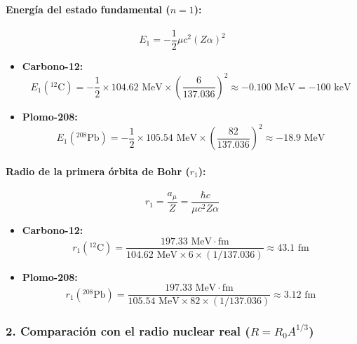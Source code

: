 \begin{problema}
\paragraph{Energía del estado fundamental ($n = 1$):}
\begin{equation*}
E_1 = -\frac{1}{2} \mu c^2 (Z \alpha)^2
\end{equation*}
\begin{itemize}
    \item \textbf{Carbono-12:}
    \begin{equation*}
    E_1({}^{12}\text{C}) = -\frac{1}{2} \times 104.62\text{ MeV} \times \left( \frac{6}{137.036} \right)^2 \approx -0.100\text{ MeV} = -100\text{ keV}
    \end{equation*}
    \item \textbf{Plomo-208:}
    \begin{equation*}
    E_1({}^{208}\text{Pb}) = -\frac{1}{2} \times 105.54\text{ MeV} \times \left( \frac{82}{137.036} \right)^2 \approx -18.9\text{ MeV}
    \end{equation*}
\end{itemize}

\paragraph{Radio de la primera órbita de Bohr ($r_1$):}
\begin{equation*}
r_1 = \frac{a_\mu}{Z} = \frac{\hbar c}{\mu c^2 Z \alpha}
\end{equation*}
\begin{itemize}
    \item \textbf{Carbono-12:}
    \begin{equation*}
    r_1({}^{12}\text{C}) = \frac{197.33\text{ MeV}\cdot\text{fm}}{104.62\text{ MeV} \times 6 \times (1/137.036)} \approx 43.1\text{ fm}
    \end{equation*}
    \item \textbf{Plomo-208:}
    \begin{equation*}
    r_1({}^{208}\text{Pb}) = \frac{197.33\text{ MeV}\cdot\text{fm}}{105.54\text{ MeV} \times 82 \times (1/137.036)} \approx 3.12\text{ fm}
    \end{equation*}
\end{itemize}

\subsubsection*{2. Comparación con el radio nuclear real ($R = R_0 A^{1/3}$)}


\end{problema}
